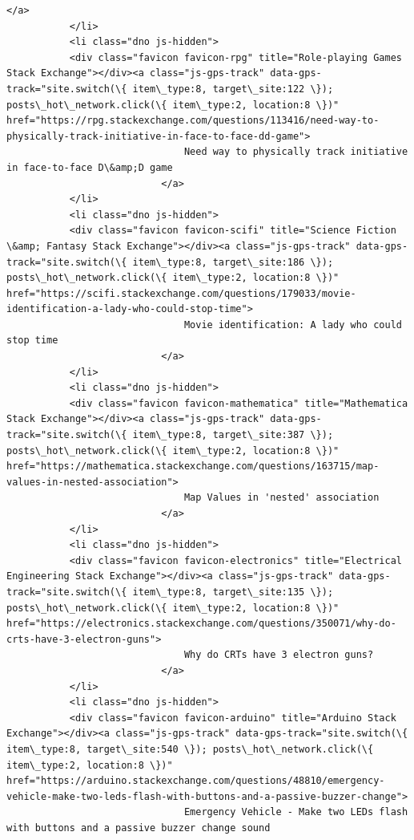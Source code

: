 \documentclass[11pt]{article}
\begin{document}
\begin{Verbatim}[commandchars=\\\{\}]
                           </a>
           </li>
           <li class="dno js-hidden">
           <div class="favicon favicon-rpg" title="Role-playing Games Stack Exchange"></div><a class="js-gps-track" data-gps-track="site.switch(\{ item\_type:8, target\_site:122 \}); posts\_hot\_network.click(\{ item\_type:2, location:8 \})" href="https://rpg.stackexchange.com/questions/113416/need-way-to-physically-track-initiative-in-face-to-face-dd-game">
                               Need way to physically track initiative in face-to-face D\&amp;D game
                           </a>
           </li>
           <li class="dno js-hidden">
           <div class="favicon favicon-scifi" title="Science Fiction \&amp; Fantasy Stack Exchange"></div><a class="js-gps-track" data-gps-track="site.switch(\{ item\_type:8, target\_site:186 \}); posts\_hot\_network.click(\{ item\_type:2, location:8 \})" href="https://scifi.stackexchange.com/questions/179033/movie-identification-a-lady-who-could-stop-time">
                               Movie identification: A lady who could stop time
                           </a>
           </li>
           <li class="dno js-hidden">
           <div class="favicon favicon-mathematica" title="Mathematica Stack Exchange"></div><a class="js-gps-track" data-gps-track="site.switch(\{ item\_type:8, target\_site:387 \}); posts\_hot\_network.click(\{ item\_type:2, location:8 \})" href="https://mathematica.stackexchange.com/questions/163715/map-values-in-nested-association">
                               Map Values in 'nested' association
                           </a>
           </li>
           <li class="dno js-hidden">
           <div class="favicon favicon-electronics" title="Electrical Engineering Stack Exchange"></div><a class="js-gps-track" data-gps-track="site.switch(\{ item\_type:8, target\_site:135 \}); posts\_hot\_network.click(\{ item\_type:2, location:8 \})" href="https://electronics.stackexchange.com/questions/350071/why-do-crts-have-3-electron-guns">
                               Why do CRTs have 3 electron guns?
                           </a>
           </li>
           <li class="dno js-hidden">
           <div class="favicon favicon-arduino" title="Arduino Stack Exchange"></div><a class="js-gps-track" data-gps-track="site.switch(\{ item\_type:8, target\_site:540 \}); posts\_hot\_network.click(\{ item\_type:2, location:8 \})" href="https://arduino.stackexchange.com/questions/48810/emergency-vehicle-make-two-leds-flash-with-buttons-and-a-passive-buzzer-change">
                               Emergency Vehicle - Make two LEDs flash with buttons and a passive buzzer change sound

\end{Verbatim}
\end{document}
